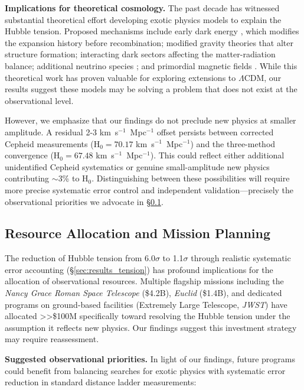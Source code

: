 \documentclass[twocolumn, linenumbers]{aastex701}
\begin{document}
\textbf{Implications for theoretical cosmology.} The past decade has witnessed substantial theoretical effort developing exotic physics models to explain the Hubble tension. Proposed mechanisms include early dark energy \citep{Poulin2019}, which modifies the expansion history before recombination; modified gravity theories \citep{Marra2021} that alter structure formation; interacting dark sectors \citep{DiValentino2020} affecting the matter-radiation balance; additional neutrino species \citep{Anchordoqui2022}; and primordial magnetic fields \citep{Jedamzik2020}. While this theoretical work has proven valuable for exploring extensions to $\Lambda$CDM, our results suggest these models may be solving a problem that does not exist at the observational level.

However, we emphasize that our findings do not preclude new physics at smaller amplitude. A residual 2-3 km~s$^{-1}$~Mpc$^{-1}$ offset persists between corrected Cepheid measurements (H$_0 = 70.17$ km~s$^{-1}$~Mpc$^{-1}$) and the three-method convergence (H$_0 = 67.48$ km~s$^{-1}$~Mpc$^{-1}$). This could reflect either additional unidentified Cepheid systematics or genuine small-amplitude new physics contributing $\sim$3\% to H$_0$. Distinguishing between these possibilities will require more precise systematic error control and independent validation---precisely the observational priorities we advocate in \S\ref{sec:discussion_resources}.

\subsection{Resource Allocation and Mission Planning} \label{sec:discussion_resources}

The reduction of Hubble tension from 6.0$\sigma$ to 1.1$\sigma$ through realistic systematic error accounting (\S\ref{sec:results_tension}) has profound implications for the allocation of observational resources. Multiple flagship missions including the \textit{Nancy Grace Roman Space Telescope} (\$4.2B), \textit{Euclid} (\$1.4B), and dedicated programs on ground-based facilities (Extremely Large Telescope, \textit{JWST}) have allocated >>\$100M specifically toward resolving the Hubble tension under the assumption it reflects new physics. Our findings suggest this investment strategy may require reassessment.

\textbf{Suggested observational priorities.} In light of our findings, future programs could benefit from balancing searches for exotic physics with systematic error reduction in standard distance ladder measurements:
\end{document}
